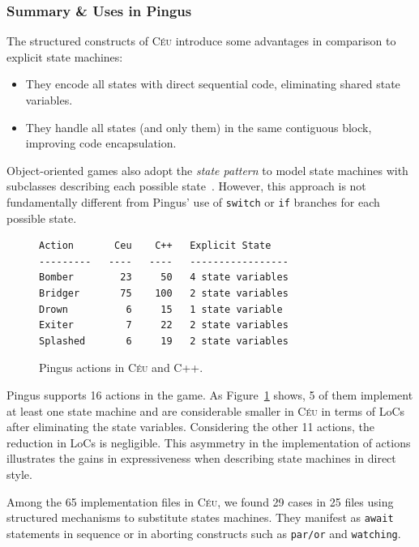 \documentclass{vgtc}                          %
\newcommand{\CEU}{\textsc{C\'{e}u}\xspace}
\newcommand{\code}[1] {{\small{\texttt{#1}}}}
\begin{document}
\subsubsection{Summary \& Uses in Pingus}

The structured constructs of \CEU introduce some advantages in comparison to 
explicit state machines:
%
\begin{itemize}
\item They encode all states with direct sequential code, eliminating shared
      state variables.
\item They handle all states (and only them) in the same contiguous block,
      improving code encapsulation.
\end{itemize}
%
Object-oriented games also adopt the \emph{state pattern} to model state
machines with subclasses describing each possible state~\cite{games.patterns}.
However, this approach is not fundamentally different from Pingus' use of
\code{switch} or \code{if} branches for each possible state.

\begin{figure}[t]
\begin{verbatim}
Action       Ceu    C++   Explicit State
---------   ----   ----   -----------------
Bomber        23     50   4 state variables
Bridger       75    100   2 state variables
Drown          6     15   1 state variable
Exiter         7     22   2 state variables
Splashed       6     19   2 state variables
\end{verbatim}
\caption{Pingus actions in \CEU and C++.
\label{tab.actions}
}
\end{figure}

Pingus supports 16 actions in the game.
As Figure~\ref{tab.actions} shows, 5 of them implement at least one state
machine and are considerable smaller in \CEU in terms of LoCs after eliminating
the state variables.
%
Considering the other 11 actions, the reduction in LoCs is negligible.
This asymmetry in the implementation of actions illustrates the gains in
expressiveness when describing state machines in direct style.


Among the 65 implementation files in \CEU, we found 29 cases in 25 files using
structured mechanisms to substitute states machines.
They manifest as \code{await} statements in sequence or in aborting constructs
such as \code{par/or} and \code{watching}.
\end{document}
